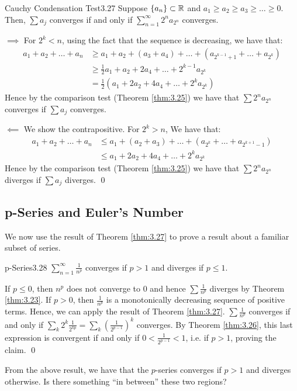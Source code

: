 \begin{theorem}{Cauchy Condensation Test}{3.27}
    Suppose $\set{a_n} \subset \mathbb{R}$ and $a_1 \geq a_2 \geq a_3 \geq \ldots \geq 0$. Then, $\sum a_j$ converges if and only if $\sum_{n=1}^\infty 2^n a_{2^n}$ converges.
\end{theorem}
\begin{nproof}
    $\boxed{\implies}$ For $2^k < n$, using the fact that the sequence is decreasing, we have that:
    \begin{align*}
        a_1 + a_2 + \ldots + a_n &\geq a_1 + a_2 + (a_3 + a_4) + \ldots + (a_{2^{k-1}+1} + \ldots + a_{2^k})
        \\ &\geq \frac{1}{2}a_1 + a_2 + 2a_4 + \ldots + 2^{k-1}a_{2^k}
        \\ &= \frac{1}{2}(a_1 + 2a_2 + 4a_4 + \ldots + 2^ka_{2^k})
    \end{align*}
    Hence by the comparison test (Theorem \ref{thm:3.25}) we have that $\sum 2^n a_{2^n}$ converges if $\sum a_j$ converges.

    $\boxed{\impliedby}$ We show the contrapositive. For $2^k > n$, We have that:
    \begin{align*}
        a_1 + a_2 + \ldots + a_n &\leq a_1 + (a_2 + a_3) + \ldots + (a_{2^k} + \ldots + a_{2^{k+1}-1})
        \\ &\leq a_1 + 2a_2 + 4a_4 + \ldots + 2^ka_{2^k}
    \end{align*}
    Hence by the comparison test (Theorem \ref{thm:3.25}) we have that $\sum 2^n a_{2^n}$ diverges if $\sum a_j$ diverges. \qed
\end{nproof}

\subsection{p-Series and Euler's Number}
We now use the result of Theorem \ref{thm:3.27} to prove a result about a familiar subset of series.

\begin{theorem}{p-Series}{3.28}
    $\sum_{n=1}^\infty \frac{1}{n^p}$ converges if $p > 1$ and diverges if $p \leq 1$. 
\end{theorem}
\begin{nproof}
    If $p \leq 0$, then $n^p$ does not converge to $0$ and hence $\sum \frac{1}{n^p}$ diverges by Theorem \ref{thm:3.23}. If $p > 0$, then $\frac{1}{n^p}$ is a monotonically decreasing sequence of positive terms. Hence, we can apply the result of Theorem \ref{thm:3.27}. $\sum \frac{1}{n^p}$ converges if and only if $\sum_k 2^k \frac{1}{2^{kp}} = \sum_k \left(\frac{1}{2^{p-1}}\right)^k$ converges. By Theorem \ref{thm:3.26}, this last expression is convergent if and only if $0 < \frac{1}{2^{p-1}} < 1$, i.e. if $p > 1$, proving the claim. \qed
\end{nproof}
\noindent From the above result, we have that the $p$-series converges if $p > 1$ and diverges otherwise. Is there something ``in between'' these two regions?

